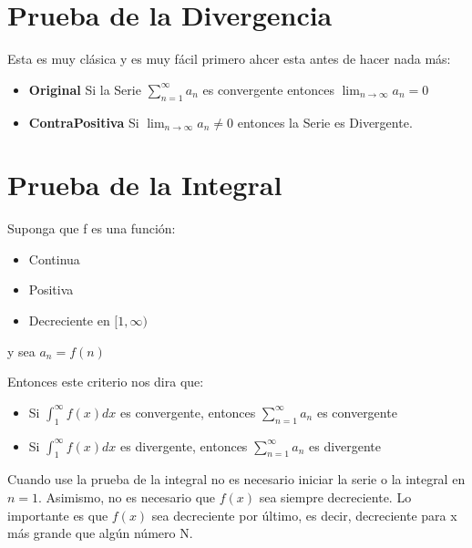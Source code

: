 \documentclass[12pt]{report}							    %
\begin{document}
    \clearpage
    \section{Prueba de la Divergencia}
        Esta es muy clásica y es muy fácil primero ahcer esta antes
        de hacer nada más:

        \begin{itemize}
            \item \textbf{Original} Si la Serie $\sum_{n=1}^{\infty} a_n$ es
            convergente entonces $\lim_{n \to \infty} a_n = 0$

            \item \textbf{ContraPositiva} Si $\lim_{n \to \infty} a_n \neq 0$ entonces la Serie es Divergente.
        \end{itemize}

    \clearpage
    \section{Prueba de la Integral}
        Suponga que f es una función:

        \begin{itemize}
            \item Continua
            \item Positiva
            \item Decreciente en $[1, \infty)$
        \end{itemize}

        y sea $a_n = f(n)$

        Entonces este criterio nos dira que:
        \begin{itemize}
           \item Si $\int_1^{\infty}f(x) dx$ es convergente, entonces $\sum_{n=1}^{\infty} a_n$ es convergente
           \item Si $\int_1^{\infty}f(x) dx$ es divergente, entonces $\sum_{n=1}^{\infty} a_n$ es divergente
        \end{itemize}

        Cuando use la prueba de la integral no es necesario iniciar la serie o la integral en $n=1$.
        Asimismo, no es necesario que $f(x)$ sea siempre decreciente.
        Lo importante es que $f(x)$ sea decreciente por último, es decir, decreciente para x más
        grande que algún número N. 
\end{document}
